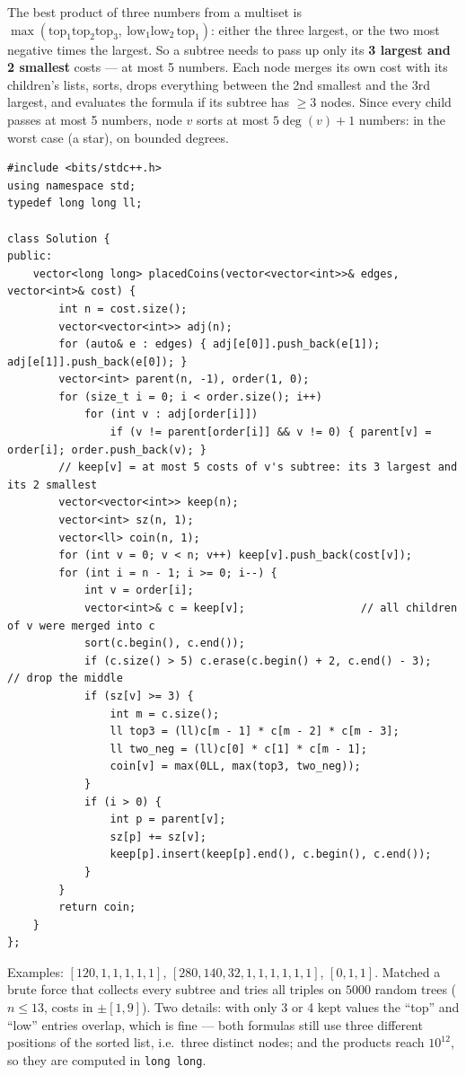 \begin{solutionbox}
The best product of three numbers from a multiset is $\max(\text{top}_1\text{top}_2\text{top}_3,\ \text{low}_1\text{low}_2\,\text{top}_1)$: either the three largest, or the two most negative times the largest. So a subtree needs to pass up only its \textbf{3 largest and 2 smallest} costs --- at most 5 numbers. Each node merges its own cost with its children's lists, sorts, drops everything between the 2nd smallest and the 3rd largest, and evaluates the formula if its subtree has $\ge 3$ nodes. Since every child passes at most 5 numbers, node $v$ sorts at most $5\deg(v) + 1$ numbers:  in the worst case (a star),  on bounded degrees.
\begin{lstlisting}[style=cpp]
#include <bits/stdc++.h>
using namespace std;
typedef long long ll;

class Solution {
public:
    vector<long long> placedCoins(vector<vector<int>>& edges, vector<int>& cost) {
        int n = cost.size();
        vector<vector<int>> adj(n);
        for (auto& e : edges) { adj[e[0]].push_back(e[1]); adj[e[1]].push_back(e[0]); }
        vector<int> parent(n, -1), order(1, 0);
        for (size_t i = 0; i < order.size(); i++)
            for (int v : adj[order[i]])
                if (v != parent[order[i]] && v != 0) { parent[v] = order[i]; order.push_back(v); }
        // keep[v] = at most 5 costs of v's subtree: its 3 largest and its 2 smallest
        vector<vector<int>> keep(n);
        vector<int> sz(n, 1);
        vector<ll> coin(n, 1);
        for (int v = 0; v < n; v++) keep[v].push_back(cost[v]);
        for (int i = n - 1; i >= 0; i--) {
            int v = order[i];
            vector<int>& c = keep[v];                  // all children of v were merged into c
            sort(c.begin(), c.end());
            if (c.size() > 5) c.erase(c.begin() + 2, c.end() - 3);   // drop the middle
            if (sz[v] >= 3) {
                int m = c.size();
                ll top3 = (ll)c[m - 1] * c[m - 2] * c[m - 3];
                ll two_neg = (ll)c[0] * c[1] * c[m - 1];
                coin[v] = max(0LL, max(top3, two_neg));
            }
            if (i > 0) {
                int p = parent[v];
                sz[p] += sz[v];
                keep[p].insert(keep[p].end(), c.begin(), c.end());
            }
        }
        return coin;
    }
};
\end{lstlisting}
Examples: $[120,1,1,1,1,1]$, $[280,140,32,1,1,1,1,1,1]$, $[0,1,1]$. Matched a brute force that collects every subtree and tries all triples on $5000$ random trees ($n \le 13$, costs in $\pm[1, 9]$). Two details: with only 3 or 4 kept values the ``top'' and ``low'' entries overlap, which is fine --- both formulas still use three different positions of the sorted list, i.e.\ three distinct nodes; and the products reach $10^{12}$, so they are computed in \texttt{long long}.
\end{solutionbox}

